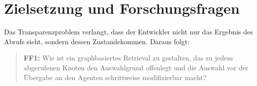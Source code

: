 \section{Zielsetzung und Forschungsfragen}%
\label{sec:forschungsfragen}

Das Transparenzproblem verlangt, dass der Entwickler nicht nur das Ergebnis des Abrufs sieht, sondern dessen Zustandekommen. Daraus folgt:

\begin{quote}
\textbf{FF1:} Wie ist ein graphbasiertes Retrieval zu gestalten, das zu jedem abgerufenen Knoten den Auswahlgrund offenlegt und die Auswahl vor der Übergabe an den Agenten schrittweise modifizierbar macht?
\end{quote}


